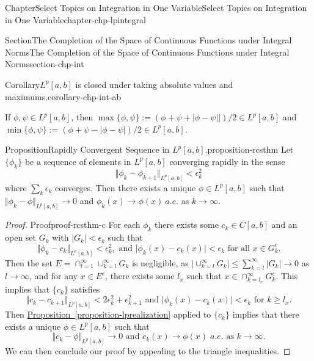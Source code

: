 \documentclass[oneside,10pt,]{book}
\newcommand{\xreffont}{\relax}
\numberwithin{equation}{section}
\begin{document}
\begin{chapterptx}{Chapter}{Select Topics on Integration in One Variable}{}{Select Topics on Integration in One Variable}{}{}{chapter-chp-lpintegral}
\begin{sectionptx}{Section}{The Completion of the Space of Continuous Functions under Integral Norms}{}{The Completion of the Space of Continuous Functions under Integral Norms}{}{}{section-chp-int}
\begin{corollary}{Corollary}{\(L^{p}[a, b]\) is closed under taking absolute values and maximums.}{}{corollary-chp-int-ab}
\par
If \(\phi, \psi\in L^{p}[a, b]\), then \(\max\{\phi, \psi\} :=(\phi + \psi + |\phi - \psi||)/2 
\in L^{p}[a, b]\) and \(\min\{\phi, \psi\} :=(\phi + \psi - |\phi - \psi|)/2 
\in L^{p}[a, b]\).%
\end{corollary}
\begin{proposition}{Proposition}{Rapidly Convergent Sequence in \(L^{p}[a, b]\).}{}{proposition-rcsthm}%
Let \(\{\phi_{k}\}\) be a sequence of elements in \(L^{p}[a, b]\) converging rapidly in the sense%
\begin{equation*}
\Vert \phi_{k} - \phi_{k+1} \Vert_{L^{p}[a, b]} < \epsilon_{k}^{2}
\end{equation*}
where \(\sum_{k}  \epsilon_{k}\) converges. Then there exists a unique \(\phi \in L^{p}[a, b]\) such that \(\Vert \phi_{k} - \phi \Vert_{L^{p}[a, b]}\to 0\) and \(\phi_{k} (x) \to \phi (x)\)\(\ a.e.\) as \(k\to \infty\).\end{proposition}
\begin{proof}{Proof}{}{proof-rcsthm-c}
For each \(\phi_{k}\) there exists some \(c_{k} \in C[a,  b]\) and an open set  \(G_{k}\) with \(|G_{k}| < \epsilon_{k}\) such that%
\begin{equation*}
\Vert \phi_{k} - c_{k} \Vert_{L^{p}[a, b]} < \epsilon_{k}^{2}, \text{ and } 
\vert \phi_{k} (x) - c_{k}(x) \vert < \epsilon_{k} \text{ for all } x\in G_{k}^{c}.
\end{equation*}
Then the set \(E=\cap_{l=1}^{\infty}\cup_{k=l}^{\infty} G_{k}\) is negligible, as \(|\cup_{k=l}^{\infty} G_{k}|\le \sum_{k=l}^{\infty}|G_{k}| \to 0\) as \(l\to \infty\), and for any \(x\in E^{c}\), there exists some \(l_{x}\) such that \(x\in \cap_{k=l_{x}}^{\infty} G_{k}^{c}\). This implies that \(\{ c_{k}\}\) satisfies%
\begin{equation*}
\Vert c_{k} - c_{k+1} \Vert_{L^{p}[a, b]} < 2\epsilon_{k}^{2} + \epsilon_{k+1}^{2}
\text{ and } \vert \phi_{k}(x) - c_{k}(x) \vert< \epsilon_{k} \text{ for } k\ge l_{x}\text{.}
\end{equation*}
Then \hyperref[proposition-lprealization]{Proposition~{\xreffont\ref{proposition-lprealization}}} applied to  \(\{ c_{k}\}\) implies that there exists a unique \(\phi \in L^{p}[a, b]\) such that%
\begin{equation*}
\Vert c_{k} - \phi \Vert_{L^{p}[a, b]} \to 0 \text{ and } c_{k}(x)\to \phi (x)\; a.e. \text{ as } k\to \infty.
\end{equation*}
We can then conclude our proof by appealing to the triangle inequalities.\end{proof}

\end{sectionptx}
\end{chapterptx}
\end{document}
